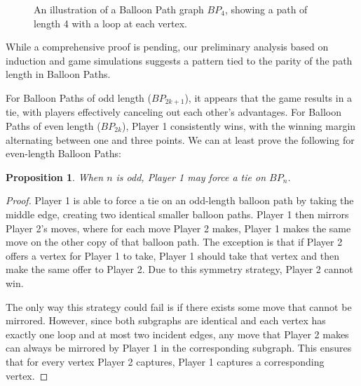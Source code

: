 \documentclass{article}
\newtheorem{proposition}[theorem]{Proposition}
\begin{document}
\begin{figure}[hbt!]
\centering
{}
\caption{An illustration of a Balloon Path graph $BP_4$, showing a path of length 4 with a loop at each vertex.}
\label{fig:balloon-path-graph}
\end{figure}
\FloatBarrier

While a comprehensive proof is pending, our preliminary analysis based on induction and game simulations suggests a pattern tied to the parity of the path length in Balloon Paths.

For Balloon Paths of odd length ($BP_{2k+1}$), it appears that the game results in a tie, with players effectively canceling out each other's advantages. For Balloon Paths of even length ($BP_{2k}$), Player 1 consistently wins, with the winning margin alternating between one and three points. We can at least prove the following for even-length Balloon Paths:

\begin{proposition} When $n$ is odd, Player 1 may force a tie on $BP_n$. \label{Odd balloon paths are ties}
\end{proposition}
\begin{proof}
Player 1 is able to force a tie on an odd-length balloon path by taking the middle edge, creating two identical smaller balloon paths. Player 1 then mirrors Player 2's moves, where for each move Player 2 makes, Player 1 makes the same move on the other copy of that balloon path. The exception is that if Player 2 offers a vertex for Player 1 to take, Player 1 should take that vertex and then make the same offer to Player 2. Due to this symmetry strategy, Player 2 cannot win.

The only way this strategy could fail is if there exists some move that cannot be mirrored. However, since both subgraphs are identical and each vertex has exactly one loop and at most two incident edges, any move that Player 2 makes can always be mirrored by Player 1 in the corresponding subgraph. This ensures that for every vertex Player 2 captures, Player 1 captures a corresponding vertex.
\end{proof}
\end{document}
